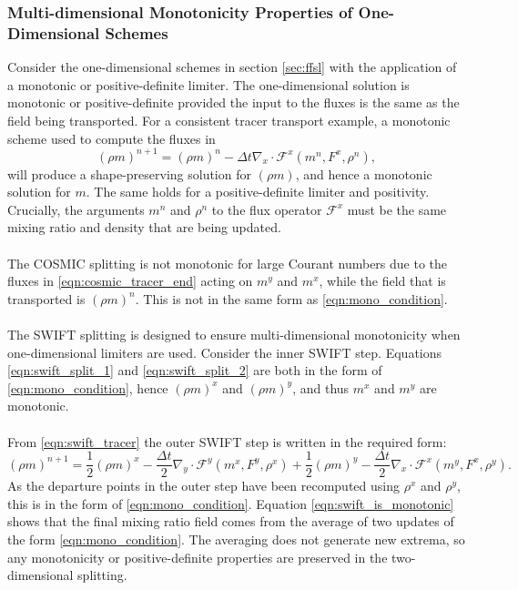 \documentclass[11pt,a4paper]{article}
\begin{document}
\subsubsection{Multi-dimensional Monotonicity Properties of One-Dimensional Schemes}
Consider the one-dimensional schemes in section \ref{sec:ffsl} with the application of a monotonic or positive-definite limiter. The one-dimensional solution is monotonic or positive-definite provided the input to the fluxes is the same as the field being transported. For a consistent tracer transport example, a monotonic scheme used to compute the fluxes in
\begin{equation} \label{eqn:mono_condition}
    (\rho m)^{n+1} = (\rho m)^n - \Delta{t} \nabla_x\cdot \mathcal{F}^x(m^n, F^x, \rho^n), 
\end{equation}
will produce a shape-preserving solution for $(\rho m)$, and hence a monotonic solution for $m$. The same holds for a positive-definite limiter and positivity.
Crucially, the arguments $m^n$ and $\rho^n$ to the flux operator $\mathcal{F}^x$ must be the same mixing ratio and density that are being updated. \\
\\
The COSMIC splitting is not monotonic for large Courant numbers due to the fluxes in \eqref{eqn:cosmic_tracer_end} acting on $m^y$ and $m^x$, while the field that is transported is $(\rho m)^n$. This is not in the same form as \eqref{eqn:mono_condition}. \\ 
\\
The SWIFT splitting is designed to ensure multi-dimensional monotonicity when one-dimensional limiters are used. Consider the inner SWIFT step. Equations \eqref{eqn:swift_split_1} and \eqref{eqn:swift_split_2} are both in the form of \eqref{eqn:mono_condition}, hence $(\rho m)^x$ and $(\rho m)^y$, and thus $m^x$ and $m^y$ are monotonic. \\
\\
From \eqref{eqn:swift_tracer} the outer SWIFT step is written in the required form:
\begin{equation}
    (\rho m)^{n+1}  = \frac{1}{2}(\rho m)^x  -\frac{\Delta{t}}{2}\nabla_y\cdot \mathcal{F}^y(m^x,F^{y},\rho^x) +  \frac{1}{2}(\rho m)^y - \frac{\Delta{t}}{2}\nabla_x\cdot \mathcal{F}^x(m^y,F^{x},\rho^y). \label{eqn:swift_is_monotonic}
\end{equation}
As the departure points in the outer step have been recomputed using $\rho^x$ and $\rho^y$, this is in the form of \eqref{eqn:mono_condition}.
Equation \eqref{eqn:swift_is_monotonic} shows that the final mixing ratio field comes from the average of two updates of the form \eqref{eqn:mono_condition}.
The averaging does not generate new extrema, so any monotonicity or positive-definite properties are preserved in the two-dimensional splitting.
\end{document}
